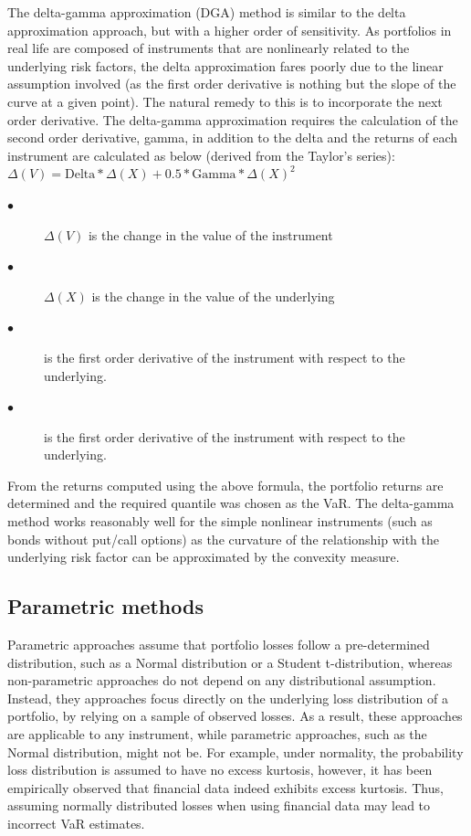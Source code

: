 \documentclass[a4paper,11pt,oneside]{book}
\begin{document}
The delta-gamma approximation (DGA) method is
similar to the delta approximation approach, but
with a higher order of sensitivity. As portfolios in
real life are composed of instruments that are nonlinearly related to the underlying risk factors, the
delta approximation fares poorly due to the linear
assumption involved (as the first order derivative is
nothing but the slope of the curve at a given point).
The natural remedy to this is to incorporate the
next order derivative. The delta-gamma approximation requires the calculation of the second
order derivative, gamma, in addition to the delta
and the returns of each instrument are calculated
as below (derived from the Taylor’s series):\newline\newline
$\Delta(V) = \text{Delta} * \Delta(X) +0.5*\text{Gamma}*\Delta(X)^2$
\begin{description}
	
	\item[$\bullet$] $\Delta(V)$ is the change in the value of the instrument
	 
	\item[$\bullet$] $\Delta(X)$ is the change in the value of the underlying
	\item[$\bullet$]  is the first order derivative of the
	instrument with respect to the underlying.
	\item[$\bullet$]  is the first order derivative of the
	instrument with respect to the underlying.
	
\end{description}

From the returns computed using the above
formula, the portfolio returns are determined and
the required quantile was chosen as the VaR. The
delta-gamma method works reasonably well for
the simple nonlinear instruments (such as bonds
without put/call options) as the curvature of the
relationship with the underlying risk factor can be
approximated by the convexity measure.


\subsection{Parametric methods}

Parametric approaches assume that portfolio losses follow a pre-determined
distribution, such as a Normal distribution or a Student t-distribution, whereas non-parametric
approaches do not depend on any distributional assumption. Instead, they
approaches focus directly on the underlying loss distribution of a portfolio,
by relying on a sample of observed losses. As a result, these approaches are
applicable to any instrument, while parametric approaches, such as the Normal
distribution, might not be. For example, under normality, the probability loss
distribution is assumed to have no excess kurtosis, however, it has been empirically
observed that financial data indeed exhibits excess kurtosis. Thus, assuming normally
distributed losses when using financial data may lead to incorrect VaR estimates.
\end{document}
